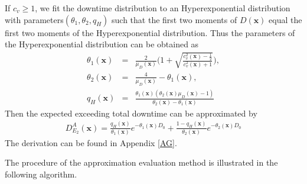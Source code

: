 \documentclass[preprint,12pt]{elsarticle}
\begin{document}
If $c_{v} \geq 1$, we fit the downtime distribution to an Hyperexponential distribution with parameters$(\theta_{1},\theta_{2}, q_{H})$ such that the first two moments of $D(\boldsymbol{x})$ equal the first two moments of the Hyperexponential distribution. Thus the parameters of the Hyperexponential distribution can be obtained as
\begin{eqnarray}
     \theta_{1}(\boldsymbol{x}) &=& \frac{2}{\mu_{D}(\boldsymbol{x})}\bigg(1+\sqrt{\frac{c^{2}_{v}(\boldsymbol{x})-\frac{1}{2}}{c^{2}_{v}(\boldsymbol{x})+1}} \bigg), \label{theta11}\\
     \theta_{2}(\boldsymbol{x}) &=& \frac{4}{\mu_{D}(\boldsymbol{x})} - \theta_{1}(\boldsymbol{x}), \label{theta12}\\
     q_{H}(\boldsymbol{x}) &=& \frac{\theta_1(\boldsymbol{x})(\theta_2(\boldsymbol{x})\mu_{D}(\boldsymbol{x})-1)}{\theta_2(\boldsymbol{x}) -\theta_1(\boldsymbol{x})} \label{q2}
\end{eqnarray}
Then the expected exceeding total downtime can be approximated by
\begin{eqnarray}
D_{E_{2}}^{A}(\boldsymbol{x}) =\frac{q_{H}(\boldsymbol{x})}{\theta_{1}(\boldsymbol{x})} e^{-\theta_{1}(\boldsymbol{x}) D_0 } + \frac{1-q_{H}(\boldsymbol{x})}{\theta_{2}(\boldsymbol{x})} e^{-\theta_{2}(\boldsymbol{x}) D_0} \label{EXD2}
\end{eqnarray}
The derivation can be found in Appendix \ref{AG}.


The procedure of the approximation evaluation method is illustrated in the following algorithm.
\end{document}
